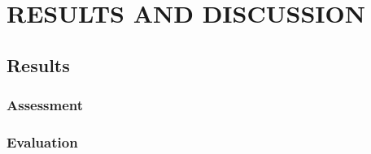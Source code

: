 
\chapter{RESULTS AND DISCUSSION} %

\section{Results}
\subsection{Assessment}

\subsection{Evaluation}
